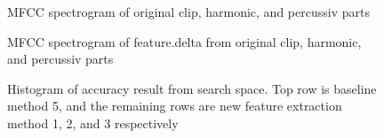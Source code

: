 \documentclass[final]{siamltexmm}
\begin{document}
\begin{figure}[!ht]
  \centering
  \caption{MFCC spectrogram of original clip, harmonic, and percussiv parts}
\end{figure}

\begin{figure}[!ht]
  \centering
  \caption{MFCC spectrogram of feature.delta from original clip, harmonic, and percussiv parts}
\end{figure}

\begin{figure}[!ht]
  \centering
  \caption{Histogram of accuracy result from search space. Top row is baseline method 5, and the remaining rows are new feature extraction method 1, 2, and 3 respectively}
\end{figure}
\end{document}
